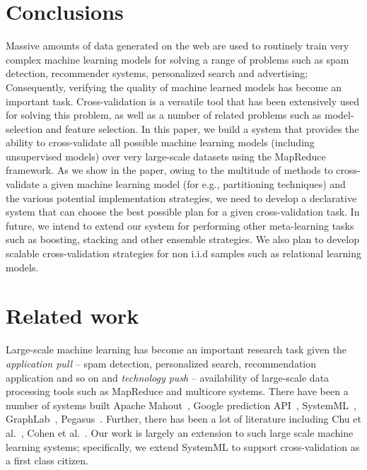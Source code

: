 \documentclass{vldb}
\newcommand{\eat}[1]{} %
\newcommand{\topic}[1]{\par \smallskip \smallskip \noindent{\bf \uline{#1}}}
\begin{document}
\eat{
\begin{figure}
\centering
\begin{tabular}{cc}
\end{tabular}
\caption{
In (e), the time taken for row partitioning increases as $k$ increases. This is because
we are currently replicating the dataset. We need to avoid copying over the dataset
multiple times.}
\end{figure}
}

\section{Conclusions}

Massive amounts of data generated on the web are used to routinely train very
complex machine learning models for solving a range of problems such as spam
detection, recommender systems, personalized search and advertising;
Consequently, verifying the quality of machine learned models has become an
important task. Cross-validation is a versatile tool that has been extensively
used for solving this problem, as well as a number of related problems such as
model-selection and feature selection. In this paper, we build a system that
provides the ability to cross-validate all possible machine learning models
(including unsupervised models) over very large-scale datasets using the
MapReduce framework. As we show in the paper, owing to the multitude of methods
to cross-validate a given machine learning model (for e.g., partitioning
techniques) and the various potential implementation strategies, we need to
develop a declarative system that can choose the best possible plan for a given
cross-validation task.  In future, we intend to extend our system for performing
other meta-learning tasks such as boosting, stacking and other ensemble
strategies. We also plan to develop scalable cross-validation strategies for non
i.i.d samples such as relational learning models.

\section{Related work}
\label{sec:related}
\topic{Large-scale machine learning:}
Large-scale machine learning has become an important research task given the
{\em application pull} -- spam detection, personalized search, recommendation
application and so on and {\em technology push} -- availability of large-scale data processing
tools such as MapReduce and multicore systems. There have been a number of
systems built Apache Mahout~\cite{mahout}, Google prediction API~\cite{gapi},
SystemML~\cite{DBLP:conf/icde/TianK11}, GraphLab~\cite{Low+al:uai10graphlab},
Pegasus~\cite{DBLP:conf/icdm/KangTF09}. Further, there has been a
lot of literature including Chu et al.~\cite{DBLP:conf/nips/ChuKLYBNO06}, Cohen
et al.~\cite{DBLP:journals/pvldb/CohenDDHW09}. Our work
is largely an extension to such large scale machine learning systems;
specifically, we extend SystemML to support cross-validation as a first class
citizen.
\end{document}
